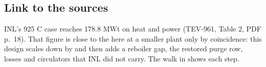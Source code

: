 \subsection*{Link to the sources}
INL's 925 C case reaches 178.8 MWt on heat and power (TEV-961, Table 2, PDF p.~18). That figure is close to the \vQRB{} here at a smaller plant only by coincidence: this design scales down by \vScaleB{} and then adds a reboiler gap, the restored purge row, losses and circulators that INL did not carry. The walk in  shows each step.
